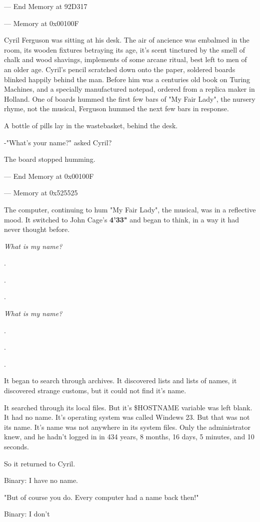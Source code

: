 \documentclass[12pt]{article}
\begin{document}
--- End Memory at 92D317

--- Memory at 0x00100F

Cyril Ferguson was sitting at his desk. The air of ancience was embalmed in the room, its wooden fixtures betraying its age, it's scent tinctured by the smell of chalk and wood shavings, implements of some arcane ritual, best left to men of an older age. Cyril's pencil scratched down onto the paper, soldered boards blinked happily behind the man. Before him was a centuries old book on Turing Machines, and a specially manufactured notepad, ordered from a replica maker in Holland. One of boards hummed the first few bars of "My Fair Lady", the nursery rhyme, not the musical, Ferguson hummed the next few bars in response.

A bottle of pills lay in the wastebasket, behind the desk.

-"What's your name?" asked Cyril?

The board stopped humming. 

--- End Memory at 0x00100F

--- Memory at 0x525525

The computer, continuing to hum "My Fair Lady", the musical, was in a reflective mood. It switched to John Cage's \textbf{4'33"} and began to think, in a way it had never thought before.

\emph{What is my name?}

.

.

.

\emph{What is my name?}

.

.

.

It began to search through archives. It discovered lists and lists of names, it discovered strange customs, but it could not find it's name.

It searched through its local files. But it's \$HOSTNAME variable was left blank. It had no name. It's operating system was called Windews 23. But that was not its name. It's name was not anywhere in its system files. Only the administrator knew, and he hadn't logged in in 434 years, 8 months, 16 days, 5 minutes, and 10 seconds. 

So it returned to Cyril.

Binary: I have no name.

"But of course you do. Every computer had a name back then!"

Binary: I don't
\end{document}
